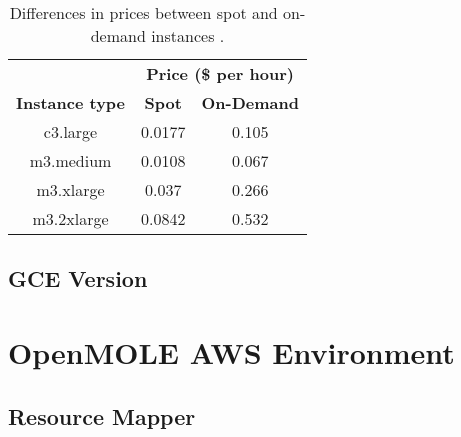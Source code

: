 \begin{table}[h]
\centering
\begin{tabular}{ccc}
\multicolumn{1}{l}{} & \multicolumn{2}{c}{\textbf{Price (\$ per hour)}} \\ \cline{2-3} 
\multicolumn{1}{c|}{\textbf{Instance type}} & \multicolumn{1}{c|}{\textbf{Spot}} & \multicolumn{1}{c|}{\textbf{On-Demand}} \\ \hline
\multicolumn{1}{|c|}{c3.large} & \multicolumn{1}{c|}{0.0177} & \multicolumn{1}{c|}{0.105} \\ \hline
\multicolumn{1}{|c|}{m3.medium} & \multicolumn{1}{c|}{0.0108} & \multicolumn{1}{c|}{0.067} \\ \hline
\multicolumn{1}{|c|}{m3.xlarge} & \multicolumn{1}{c|}{0.037} & \multicolumn{1}{c|}{0.266} \\ \hline
\multicolumn{1}{|c|}{m3.2xlarge} & \multicolumn{1}{c|}{0.0842} & \multicolumn{1}{c|}{0.532} \\ \hline
\end{tabular}
\caption{Differences in prices between spot and on-demand instances \cite{AWSPricing}.}
\label{SpotPricing}
\end{table}

\subsection{GCE Version}

\section{OpenMOLE AWS Environment}

\subsection{Resource Mapper}


